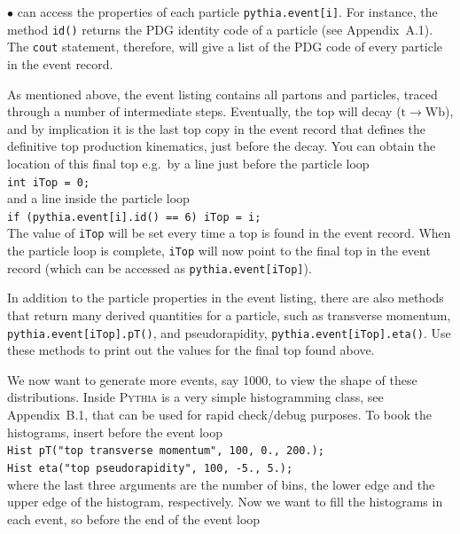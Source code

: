 \documentclass[12pt,a4paper]{article}
\renewcommand{\b}{{\mathrm b}}
\renewcommand{\t}{{\mathrm t}}
\newcommand{\W}{{\mathrm W}}
\newenvironment{Itemize}{\begin{list}{$\bullet$}%
{\setlength{\topsep}{0.4mm}\setlength{\partopsep}{0.4mm}%
\setlength{\itemsep}{0.4mm}\setlength{\parsep}{0.4mm}}}%
{\end{list}}
\begin{document}
\begin{Itemize}
can access the properties of each particle \texttt{pythia.event[i]}. For
instance, the method \texttt{id()} returns the PDG identity code of a
particle (see Appendix~A.1). The \texttt{cout} statement, therefore, will
give a list of the PDG code of every particle in the event record.
\item As mentioned above, the event listing contains all partons and
particles, traced through a number of intermediate steps. Eventually, the
top will decay ($\t \to \W \b$), and by implication it is the last top copy
in the event record that defines the definitive top production kinematics,
just before the decay. You can obtain the location of this final top 
e.g.\ by a line just before the particle loop \\
\hspace*{10mm}\texttt{int iTop = 0;} \\
and a line inside the particle loop \\
\hspace*{10mm}\texttt{if (pythia.event[i].id() == 6) iTop = i;} \\ 
The value of \texttt{iTop} will be set every time a top is found in the
event record. When the particle loop is complete, \texttt{iTop}
will now point to the final top in the event record (which can be accessed
as \texttt{pythia.event[iTop]}).
\item In addition to the particle properties in the event listing,  
there are also methods that return many derived quantities for a 
particle, such as transverse momentum, \texttt{pythia.event[iTop].pT()},
and pseudorapidity, \texttt{pythia.event[iTop].eta()}. Use these methods
to print out the values for the final top found above. 
\item We now want to generate more events, say 1000, to view the shape
of these distributions. Inside \textsc{Pythia} is a very simple
histogramming class, see Appendix~B.1, that can be used for rapid 
check/debug purposes. To book the histograms, insert before the 
event loop \\
\hspace*{10mm}\texttt{Hist pT("top transverse momentum", 100, 0., 200.);}\\
\hspace*{10mm}\texttt{Hist eta("top pseudorapidity", 100, -5., 5.);}\\
where the last three arguments are the number of bins, the lower edge and
the upper edge of the histogram, respectively. Now we want to fill the
histograms in each event, so before the end of the event loop

\end{Itemize}
\end{document}

